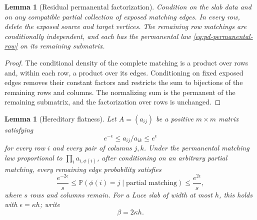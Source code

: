 \documentclass[11pt]{article}
\newtheorem{lemma}[theorem]{Lemma}
\theoremstyle{remark}
\newcommand{\Pp}{\mathbb P}
\begin{document}
\begin{lemma}[Residual permanental factorization]
\label{lem:pd-residual-factorization}
Condition on the slab data and on any compatible partial collection of exposed
matching edges.  In every row, delete the exposed source and target vertices.
The remaining row matchings are conditionally independent, and each has the
permanental law \eqref{eq:pd-permanental-row} on its remaining submatrix.
\end{lemma}

\begin{proof}
The conditional density of the complete matching is a product over rows and,
within each row, a product over its edges.  Conditioning on fixed exposed edges
removes their constant factors and restricts the sum to bijections of the
remaining rows and columns.  The normalizing sum is the permanent of the
remaining submatrix, and the factorization over rows is unchanged.
\end{proof}

\begin{lemma}[Hereditary flatness]
\label{lem:pd-hereditary-flatness}
Let $A=(a_{ij})$ be a positive $m\times m$ matrix satisfying
\[
        e^{-\epsilon}\le a_{ij}/a_{ik}\le e^\epsilon
\]
for every row $i$ and every pair of columns $j,k$.  Under the permanental
matching law proportional to $\prod_i a_{i,\phi(i)}$, after conditioning on an
arbitrary partial matching, every remaining edge probability satisfies
\[
 \frac{e^{-2\epsilon}}s
 \le\Pp(\phi(i)=j\mid\text{partial matching})
 \le\frac{e^{2\epsilon}}s,
\]
where $s$ rows and columns remain.  For a Luce slab of width at most $h$, this
holds with $\epsilon=\kappa h$; write
\[
        \beta=2\kappa h.
        \tag{6.4}
\]
\end{lemma}
\end{document}
